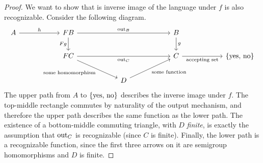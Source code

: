\begin{proof}
We want to show that is inverse image of the language under $f$ is also recognizable. Consider the following diagram. 
\[\begin{tikzcd}
    [column sep=2cm]
	A & {\functor B} & & B \\
	& {\functor C} & & C & \set{\text{yes, no}}\\
    & & D
	\arrow["h", from=1-1, to=1-2]
	\arrow["\outfun_B", from=1-2, to=1-4]
	\arrow["{\functor g}"', from=1-2, to=2-2]
	\arrow["\outfun_C"', from=2-2, to=2-4]
	\arrow["g", from=1-4, to=2-4]
	\arrow["\text{accepting set}"', from=2-4, to=2-5]
    \arrow["\text{some homomorphism}"', from=2-2, to=3-3]
    \arrow["\text{some function}"', from=3-3, to=2-4]
\end{tikzcd}\]
The upper path from $A$ to $\{\text{yes, no}\}$ describes the inverse image under $f$. 
 The top-middle rectangle commutes by naturality of the output mechanism, and therefore the upper path describes the same function as the lower path. The existence of a bottom-middle commuting triangle, with $D$ \emph{finite}, is exactly the assumption that $\mathrm{out}_C$ is recognizable (since $C$ is finite). Finally, the lower path is a recognizable function, since the first three arrows on it are semigroup homomorphisms and $D$ is finite.
\end{proof}

